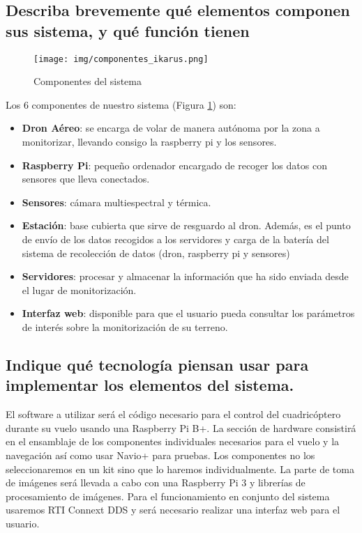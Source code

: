 \documentclass[11pt,spanish]{article} %
\begin{document}
\subsection{Describa brevemente qué elementos componen sus sistema, y qué función tienen}

\begin{figure}[H]
	\centering
	\texttt{[image: img/componentes\_ikarus.png]}
	\caption{Componentes del sistema}
	\label{fig:esquema_inicial}
\end{figure}

Los 6 componentes de nuestro sistema (Figura \ref{fig:esquema_inicial}) son:
\begin{itemize}
\item \textbf{Dron Aéreo}: se encarga de volar de manera autónoma por la zona a monitorizar, llevando consigo la raspberry pi y los sensores.

\item \textbf{Raspberry Pi}: pequeño ordenador encargado de recoger los datos con sensores que lleva conectados.

\item \textbf{Sensores}: cámara multiespectral y térmica. 

\item \textbf{Estación}: base cubierta que sirve de resguardo al dron. Además, es el punto de envío de los datos recogidos a los servidores y carga de la batería del sistema de recolección de datos (dron, raspberry pi  y sensores)

\item \textbf{Servidores}: procesar y almacenar la información que ha sido enviada desde el lugar de monitorización.

\item \textbf{Interfaz web}: disponible para que el usuario pueda consultar los parámetros de interés sobre la monitorización de su terreno.
\end{itemize}

\subsection{Indique qué tecnología piensan usar para implementar los elementos del sistema.}
El software a utilizar será el código necesario para el control del cuadricóptero durante su vuelo usando una Raspberry Pi B+. La sección de hardware consistirá en el ensamblaje de los componentes individuales necesarios para el vuelo y la navegación así como usar Navio+ para pruebas. Los componentes no los seleccionaremos en un kit sino que lo haremos individualmente. La parte de toma de imágenes será llevada a cabo con una Raspberry Pi 3 y librerías de procesamiento de imágenes. Para el funcionamiento en conjunto del sistema usaremos RTI Connext DDS y será necesario realizar una interfaz web para el usuario.
\end{document}
